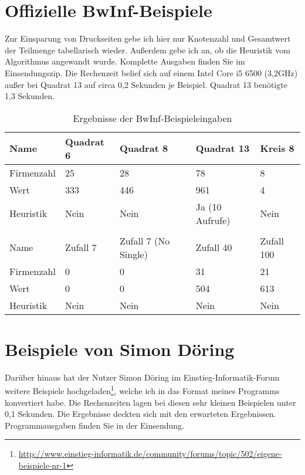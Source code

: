 \section {Offizielle BwInf-Beispiele}
Zur Einsparung von Druckseiten gebe ich hier nur Knotenzahl und Gesamtwert der Teilmenge tabellarisch wieder. Außerdem gebe ich an, ob die Heuristik vom Algorithmus angewandt wurde. Komplette Ausgaben finden Sie im Einsendungszip. Die Rechenzeit belief sich auf einem Intel Core i5 6500 (3,2GHz) außer bei Quadrat 13 auf circa 0,2 Sekunden je Beispiel. Quadrat 13 benötigte 1,3 Sekunden.

\begin{table}[!h]
	\centering
    \begin{tabular}{lllll}
    Name       & Quadrat 6 	& Quadrat 8 				& Quadrat 13      	& Kreis 8		\\ \hline
    Firmenzahl & 25        	& 28        				& 78              	& 8      		\\
    Wert       & 333       	& 446       				& 961             	& 4      		\\
    Heuristik  & Nein      	& Nein      				& Ja (10 Aufrufe) 	& Nein  		\\ \\
    Name       & Zufall 7 	& Zufall 7 (No Single) 		& Zufall 40 		& Zufall 100 	\\ \hline
    Firmenzahl & 0       	& 0                    		& 31        		& 21        	\\
    Wert       & 0        	& 0                    		& 504       		& 613        	\\
    Heuristik  & Nein     	& Nein                 		& Nein      		& Nein      	\\
    \end{tabular}
    \caption{Ergebnisse der BwInf-Beispieleingaben}
\end{table}

\section {Beispiele von Simon Döring}
Darüber hinaus hat der Nutzer Simon Döring im Einstieg-Informatik-Forum weitere Beispiele hochgeladen\footnote{\url{http://www.einstieg-informatik.de/community/forums/topic/502/eigene-beispiele-nr-1}}, welche ich in das Format meines Programms konvertiert habe. Die Rechenzeiten lagen bei diesen sehr kleinen Beispielen unter 0,1 Sekunden. Die Ergebnisse deckten sich mit den erwarteten Ergebnissen. Programmausgaben finden Sie in der Einsendung.

